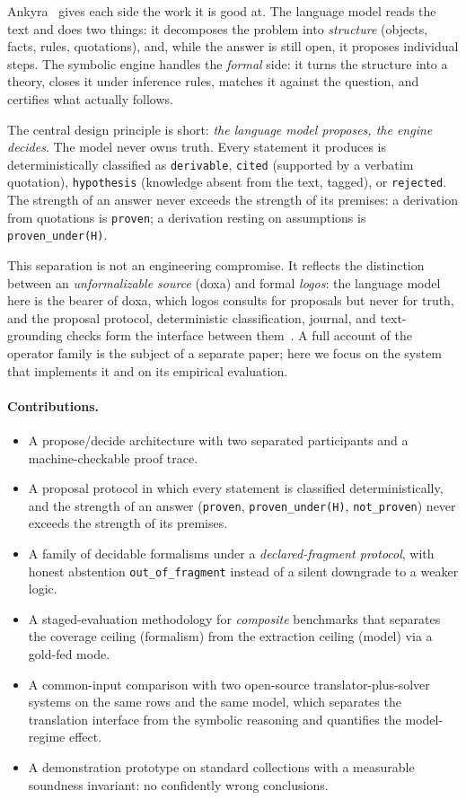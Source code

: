 \documentclass[11pt,a4paper]{article}
\begin{document}
Ankyra~\cite{ankyra} gives each side the work it is good at. The language model reads the
text and does two things: it decomposes the problem into \emph{structure} (objects, facts,
rules, quotations), and, while the answer is still open, it proposes individual steps. The
symbolic engine handles the \emph{formal} side: it turns the structure into a theory, closes
it under inference rules, matches it against the question, and certifies what actually
follows.

The central design principle is short: \emph{the language model proposes, the engine
decides}. The model never owns truth. Every statement it produces is deterministically
classified as \texttt{derivable}, \texttt{cited} (supported by a verbatim quotation),
\texttt{hypothesis} (knowledge absent from the text, tagged), or \texttt{rejected}. The
strength of an answer never exceeds the strength of its premises: a derivation from
quotations is \texttt{proven}; a derivation resting on assumptions is
\texttt{proven\_under(H)}.

This separation is not an engineering compromise. It reflects the distinction between an
\emph{unformalizable source} (doxa) and formal \emph{logos}: the language model here is the
bearer of doxa, which logos consults for proposals but never for truth, and the proposal
protocol, deterministic classification, journal, and text-grounding checks form the
interface between them~\cite{doxa}. A full account of the operator family is the subject of
a separate paper; here we focus on the system that implements it and on its empirical
evaluation.

\paragraph{Contributions.}
\begin{itemize}
\item A propose/decide architecture with two separated participants and a machine-checkable
proof trace.
\item A proposal protocol in which every statement is classified deterministically, and the
strength of an answer (\texttt{proven}, \texttt{proven\_under(H)}, \texttt{not\_proven})
never exceeds the strength of its premises.
\item A family of decidable formalisms under a \emph{declared-fragment protocol}, with
honest abstention \texttt{out\_of\_fragment} instead of a silent downgrade to a weaker
logic.
\item A staged-evaluation methodology for \emph{composite} benchmarks that separates the
coverage ceiling (formalism) from the extraction ceiling (model) via a gold-fed mode.
\item A common-input comparison with two open-source translator-plus-solver systems on the
same rows and the same model, which separates the translation interface from the symbolic
reasoning and quantifies the model-regime effect.
\item A demonstration prototype on standard collections with a measurable soundness
invariant: no confidently wrong conclusions.
\end{itemize}
\end{document}
